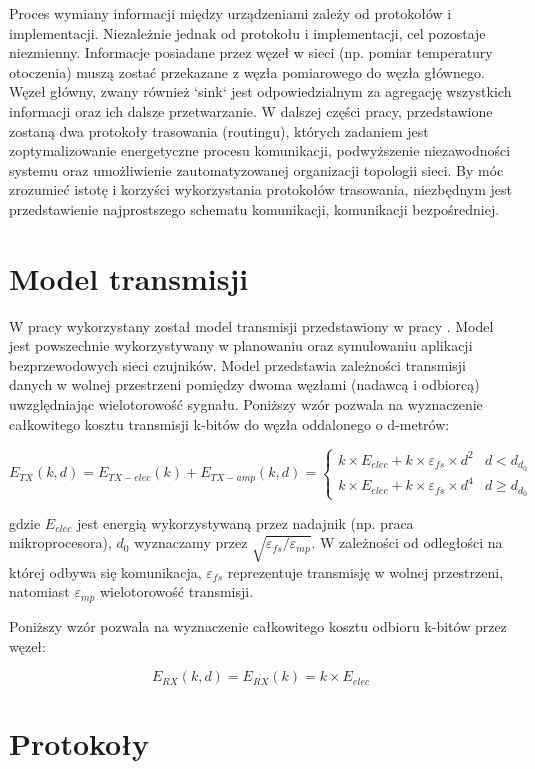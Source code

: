 \documentclass[a4paper,12pt,twoside,openany]{report}
\begin{document}
Proces wymiany informacji między urządzeniami zależy od protokołów i implementacji.
Niezależnie jednak od protokołu i implementacji, cel pozostaje niezmienny. Informacje posiadane przez węzeł w sieci (np. pomiar temperatury otoczenia) muszą zostać przekazane z węzła pomiarowego 
do węzła głównego. Węzeł główny, zwany również `sink` jest odpowiedzialnym za agregację wszystkich informacji oraz ich dalsze przetwarzanie.  
W dalszej części pracy, przedstawione zostaną dwa protokoły trasowania (routingu), których zadaniem jest zoptymalizowanie energetyczne procesu komunikacji, podwyższenie niezawodności systemu 
oraz umożliwienie zautomatyzowanej organizacji topologii sieci.
By móc zrozumieć istotę i korzyści wykorzystania protokołów trasowania, niezbędnym jest przedstawienie najprostszego schematu komunikacji, komunikacji bezpośredniej.

\section{Model transmisji}

W pracy wykorzystany został model transmisji przedstawiony w pracy \cite{Heinzelman}.
Model jest powszechnie wykorzystywany w planowaniu oraz symulowaniu aplikacji bezprzewodowych sieci czujników.
Model przedstawia zależności transmisji danych w wolnej przestrzeni pomiędzy dwoma węzłami (nadawcą i odbiorcą) uwzględniając wielotorowość sygnału.
Poniższy wzór pozwala na wyznaczenie całkowitego kosztu transmisji k-bitów do węzła oddalonego o d-metrów:

\[
E_{TX}(k,d) = E_{TX-elec}(k) + E_{TX-amp}(k,d) = \begin{cases}
 k \times E_{elec} + k \times \varepsilon_{fs} \times d^2 & d < d_{d_{0}}\\
 k \times E_{elec} + k \times \varepsilon_{fs} \times d^4 & d \geq d_{d_{0}}
\end{cases}
\]

gdzie $E_{elec}$ jest energią wykorzystywaną przez nadajnik (np. praca mikroprocesora), $d_{0}$ wyznaczamy przez $\sqrt{\varepsilon_{fs} / \varepsilon_{mp}}$.
W zależności od odległości na której odbywa się komunikacja, $\varepsilon_{fs}$ reprezentuje transmisję w wolnej przestrzeni, natomiast $\varepsilon_{mp}$
wielotorowość transmisji.

Poniższy wzór pozwala na wyznaczenie całkowitego kosztu odbioru k-bitów przez węzeł:

\[E_{RX}(k,d) = E_{RX}(k) = k \times E_{elec}\]

\section{Protokoły}
\end{document}

